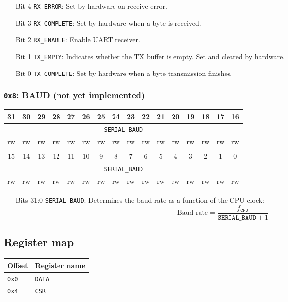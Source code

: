 \documentclass[11pt,openany]{report}
\begin{document}
\begin{enumerate}
\item[Bit 4] \verb|RX_ERROR|: Set by hardware on receive error.
\item[Bit 3] \verb|RX_COMPLETE|: Set by hardware when a byte is received.
\item[Bit 2] \verb|RX_ENABLE|: Enable UART receiver.
\item[Bit 1] \verb|TX_EMPTY|: Indicates whether the TX buffer is empty. Set and cleared by hardware.
\item[Bit 0] \verb|TX_COMPLETE|: Set by hardware when a byte transmission finishes.
\end{enumerate}


\subsubsection{\texttt{0x8}: BAUD (not yet implemented)}

\begin{center}
  \begin{tabular}{|c|c|c|c|c|c|c|c|c|c|c|c|c|c|c|c|}
    \hline
    31 & 30 & 29 & 28 & 27 & 26 & 25 & 24 & 23 & 22 & 21 & 20 & 19 & 18 & 17 & 16 \\
    \hline
    \multicolumn{16}{|c|}{\texttt{SERIAL\_BAUD}}\\
    \hline
    rw & rw & rw & rw & rw & rw & rw & rw & rw & rw & rw & rw & rw & rw & rw & rw\\
    \hline
    \multicolumn{16}{c}{}\\
    \hline
    15 & 14 & 13 & 12 & 11 & 10 & 9 & 8 & 7 & 6 & 5 & 4 & 3 & 2 & 1 & 0 \\
    \hline
    \multicolumn{16}{|c|}{\texttt{SERIAL\_BAUD}}\\
    \hline
    rw & rw & rw & rw & rw & rw & rw & rw & rw & rw & rw & rw & rw & rw & rw & rw\\
    \hline
  \end{tabular}
\end{center}

\begin{enumerate}
\item[Bits 31:0] \verb|SERIAL_BAUD|: Determines the baud rate as a function
  of the CPU clock:
  \[
  \textrm{Baud rate} = \frac{f_{\texttt{CPU}}}{\texttt{SERIAL\_BAUD} + 1}
  \]
\end{enumerate}

\subsection{Register map}
\begin{center}
  \begin{tabular}{|l|l|}
    \hline
    \textbf{Offset} & \textbf{Register name} \\
    \hline
    \texttt{0x0} & \texttt{DATA} \\
    \hline
    \texttt{0x4} & \texttt{CSR} \\
    \hline
  \end{tabular}
\end{center}
\end{document}
